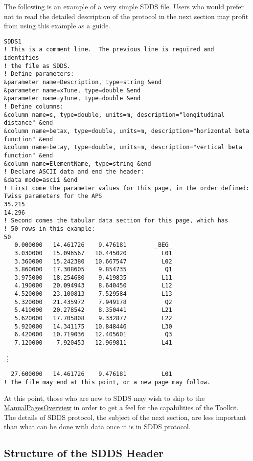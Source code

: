 \documentclass[11pt]{article}
\begin{document}
The following is an example of a very simple SDDS file.  Users who
would prefer not to read the detailed description of the protocol in
the next section may profit from using this example as a guide.
\begin{flushleft}
\begin{verbatim}
SDDS1
! This is a comment line.  The previous line is required and identifies 
! the file as SDDS.
! Define parameters: 
&parameter name=Description, type=string &end
&parameter name=xTune, type=double &end
&parameter name=yTune, type=double &end
! Define columns:
&column name=s, type=double, units=m, description="longitudinal distance" &end
&column name=betax, type=double, units=m, description="horizontal beta function" &end
&column name=betay, type=double, units=m, description="vertical beta function" &end
&column name=ElementName, type=string &end
! Declare ASCII data and end the header:
&data mode=ascii &end
! First come the parameter values for this page, in the order defined:
Twiss parameters for the APS
35.215
14.296
! Second comes the tabular data section for this page, which has
! 50 rows in this example:
50
   0.000000   14.461726    9.476181        _BEG_ 
   3.030000   15.096567   10.445020          L01 
   3.360000   15.242380   10.667547          L02 
   3.860000   17.308605    9.854735           Q1 
   3.975000   18.254680    9.419835          L11 
   4.190000   20.094943    8.640450          L12 
   4.520000   23.100813    7.529584          L13 
   5.320000   21.435972    7.949178           Q2 
   5.410000   20.278542    8.350441          L21 
   5.620000   17.705808    9.332877          L22 
   5.920000   14.341175   10.848446          L30 
   6.420000   10.719036   12.405601           Q3 
   7.120000    7.920453   12.969811          L41 
\end{verbatim}
\vdots
\begin{verbatim}
  27.600000   14.461726    9.476181          L01 
! The file may end at this point, or a new page may follow.
\end{verbatim}
\end{flushleft}

At this point, those who are new to SDDS may wish to skip to the \hyperref{ManualPagesOverview}{Manual Pages Overview
(section }{)}{ManualPagesOverview} in order to get a feel for the capabilities of the Toolkit.  The details of SDDS protocol,
the subject of the next section, are less important than what can be done with data once it is in SDDS protocol.

\subsection{Structure of the SDDS Header}
\label{sect:header}
\end{document}

